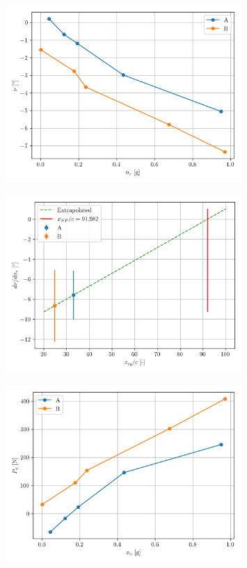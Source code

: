 \documentclass{article}
\begin{document}
\begin{figure}[H]
    \centering
    \includegraphics[width=0.8\textwidth]{Manoeuvre_Stability_1.png}
    \caption{}
    \label{fig:Manoeuvre_Stability_1}
\end{figure}
\begin{figure}[H]
    \centering
    \includegraphics[width=0.8\textwidth]{Manoeuvre_Stability_2.png}
    \caption{}
    \label{fig:Manoeuvre_Stability_2}
\end{figure}
\begin{figure}[H]
    \centering
    \includegraphics[width=0.8\textwidth]{Manoeuvre_Stability_3.png}
    \caption{}
    \label{fig:Manoeuvre_Stability_3}
\end{figure}
\end{document}
